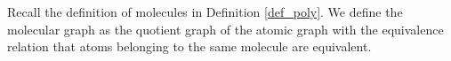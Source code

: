 \documentclass{article}
\newcommand{\1}{\mathds{1}}
\numberwithin{equation}{section}
\renewcommand{\cal}{\mathcal}
\renewcommand{\leq}{\leqslant}
\renewcommand{\le}{\leq}
\DeclareMathOperator{\OO}{O}
\theoremstyle{plain} %
\newtheorem{definition}[theorem]{Definition}
\theoremstyle{remark}
\newtheorem{remark}[theorem]{Remark}
\begin{document}
%
%


Recall the definition of molecules in Definition \ref{def_poly}. We define the molecular graph as the quotient graph of the atomic graph  with the equivalence relation that atoms belonging to the same molecule are equivalent. %
  
\end{document}
